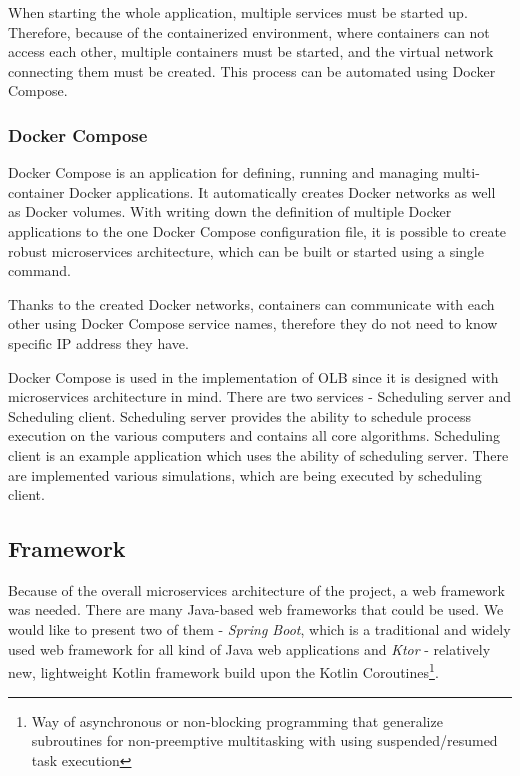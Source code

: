 When starting the whole application, 
multiple services must be started up.
Therefore, because of the containerized environment,
where containers can not access each other,
multiple containers must be started, and the virtual network connecting them must be created.
This process can be automated using Docker Compose.

\subsubsection{Docker Compose}
Docker Compose\cite{dockerComposeReference} is an application for defining, running and managing multi-container Docker applications.
It automatically creates Docker networks as well as Docker volumes.
With writing down the definition of multiple Docker applications to the one Docker Compose configuration file,
it is possible to create robust microservices architecture, 
which can be built or started using a single command.

Thanks to the created Docker networks,
containers can communicate with each other using Docker Compose service names,
therefore they do not need to know specific IP address they have.

Docker Compose is used in the implementation of OLB since it is designed with microservices architecture in mind.
There are two services - Scheduling server and Scheduling client.
Scheduling server provides the ability to schedule process execution on the various computers
and contains all core algorithms.
Scheduling client is an example application which uses the ability of scheduling server. 
There are implemented various simulations,
which are being executed by scheduling client.  

\subsection{Framework}\label{subsec:framework}
Because of the overall microservices architecture of the project,
a web framework was needed.
There are many Java-based web frameworks 
that could be used. 
We would like to present two of them - \textit{Spring Boot}, 
which is a traditional and widely used web framework for all kind of Java web applications
and \textit{Ktor} - relatively new, 
lightweight Kotlin framework build upon the Kotlin Coroutines\footnote{Way of asynchronous or non-blocking programming
that generalize subroutines for non-preemptive multitasking with using suspended/resumed task execution}.


